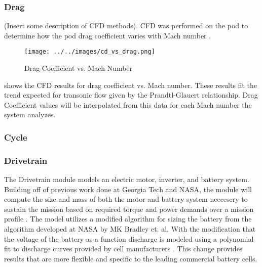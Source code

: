 \subsubsection{Drag}
	(Insert some description of CFD methods).
	CFD was performed on the pod to determine how the pod drag coefficient varies with Mach number .
	\begin{figure}
		\centering
		\texttt{[image: ../../images/cd\_vs\_drag.png]}
		\caption{Drag Coefficient vs. Mach Number}
		\label{fig:cd_vs_mach}
	\end{figure}
	 shows the CFD results for drag coefficient vs. Mach number. These results fit the trend expected for transonic flow given by the Prandtl-Glauert relationship. Drag Coefficient values will be interpolated from this data for each Mach number the system analyzes.
\subsubsection{Cycle}
\subsubsection{Drivetrain}
	The Drivetrain module  models an electric motor, inverter, and battery system. Building off of previous work done at Georgia Tech and NASA, the module will compute the size and mass of both the motor and battery system neccesery to sustain the mission based on required torque and power demands over a mission profile \cite{GeorgiaTechMotor, NASASugar}. The model utilizes a modified algorithm for sizing the battery from the algorithm developed at NASA by MK Bradley et. al. With the modification that the voltage of the battery as a function discharge is modeled using a polynomial fit to discharge curves provided by cell manufacturers \cite{NASASugar}. This change provides results that are more flexible and specific to the leading commercial battery cells.
